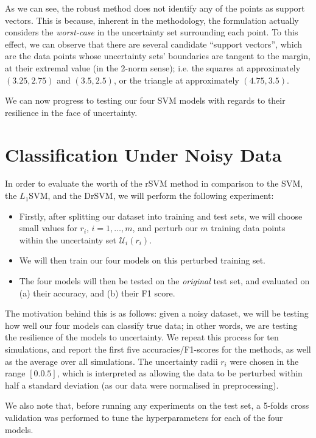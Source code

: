 \documentclass[11pt]{article}
\begin{document}
As we can see, the robust method does not identify any of the points as support vectors. This is because, inherent in the methodology, the formulation actually considers the \emph{worst-case} in the uncertainty set surrounding each point. To this effect, we can observe that there are several candidate ``support vectors'', which are the data points whose uncertainty sets' boundaries are tangent to the margin, at their extremal value (in the 2-norm sense); i.e. the squares at approximately $(3.25, 2.75)$ and $(3.5,2.5)$, or the triangle at approximately $(4.75,3.5)$. 

We can now progress to testing our four SVM models with regards to their resilience in the face of uncertainty. 

\section{Classification Under Noisy Data}
In order to evaluate the worth of the rSVM method in comparison to the SVM, the $L_1$SVM, and the DrSVM, we will perform the following experiment:
\begin{itemize}
	\item Firstly, after splitting our dataset into training and test sets, we will choose small values for $r_i$, $i=1,\dots,m$, and perturb our $m$ training data points within the uncertainty set $\mathcal{U}_i(r_i)$. 
	\item We will then train our four models on this perturbed training set. 
	\item The four models will then be tested on the \emph{original} test set, and evaluated on (a) their accuracy, and (b) their F1 score. 
\end{itemize}
The motivation behind this is as follows: given a noisy dataset, we will be testing how well our four models can classify true data; in other words, we are testing the resilience of the models to uncertainty. We repeat this process for ten simulations, and report the first five accuracies/F1-scores for the methods, as well as the average over all simulations. The uncertainty radii $r_i$ were chosen in the range $[0.0.5]$, which is interpreted as allowing the data to be perturbed within half a standard deviation (as our data were normalised in preprocessing). 

We also note that, before running any experiments on the test set, a 5-folds cross validation was performed to tune the hyperparameters for each of the four models. 
\end{document}
